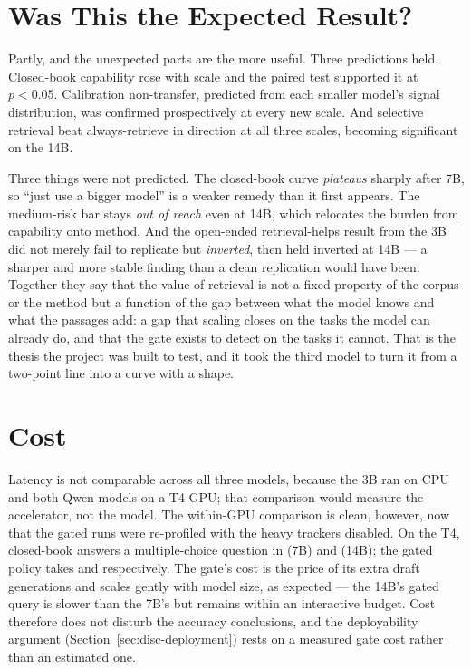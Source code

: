\section{Was This the Expected Result?}
\label{sec:cmp-expected}

Partly, and the unexpected parts are the more useful. Three predictions held.
Closed-book capability rose with scale and the paired test supported it at
$p<0.05$. Calibration non-transfer, predicted from each smaller model's signal
distribution, was confirmed prospectively at every new scale. And selective
retrieval beat always-retrieve in direction at all three scales, becoming
significant on the 14B.

Three things were not predicted. The closed-book curve \emph{plateaus} sharply
after 7B, so ``just use a bigger model'' is a weaker remedy than it first
appears. The medium-risk bar stays \emph{out of reach} even at 14B, which
relocates the burden from capability onto method. And the open-ended
retrieval-helps result from the 3B did not merely fail to replicate but
\emph{inverted}, then held inverted at 14B --- a sharper and more stable finding
than a clean replication would have been. Together they say that the value of
retrieval is not a fixed property of the corpus or the method but a function of
the gap between what the model knows and what the passages add: a gap that
scaling closes on the tasks the model can already do, and that the gate exists
to detect on the tasks it cannot. That is the thesis the project was built to
test, and it took the third model to turn it from a two-point line into a curve
with a shape.

\section{Cost}
\label{sec:cmp-cost}

Latency is not comparable across all three models, because the 3B ran on CPU
and both Qwen models on a T4 GPU; that comparison would measure the accelerator,
not the model. The within-GPU comparison is clean, however, now that the gated
runs were re-profiled with the heavy trackers disabled. On the T4, closed-book
answers a multiple-choice question in \latQwenPthreeMcq{} (7B) and
\latQwenFourteenPthreeMcq{} (14B); the gated policy takes \latQwenPfiveMcq{} and
\latQwenFourteenPfiveMcq{} respectively. The gate's cost is the price of its
extra draft generations and scales gently with model size, as expected --- the
14B's gated query is slower than the 7B's but remains within an interactive
budget. Cost therefore does not disturb the accuracy conclusions, and the
deployability argument (Section~\ref{sec:disc-deployment}) rests on a measured
gate cost rather than an estimated one.
